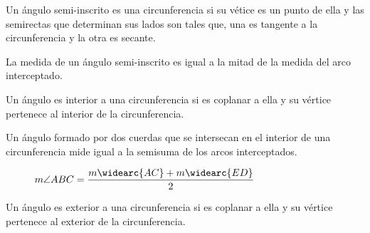 \begin{definition}
    Un ángulo semi-inscrito es una circunferencia si su vétice es un punto de ella y las semirectas que determinan sus lados son tales que, una es tangente a la circunferencia y la otra es secante.
\end{definition}

\begin{theorem}
    La medida de un ángulo semi-inscrito es igual a la mitad de la medida del arco interceptado.

    \begin{figure}[!h]
        \centering
        
        \label{fig:theorem32}
    \end{figure}
    
\end{theorem}

\clearpage

\begin{definition}
    Un ángulo es interior a una circunferencia si es coplanar a ella y su vértice pertenece al interior de la circunferencia.
\end{definition}

\begin{theorem}
    Un ángulo formado por dos cuerdas que se intersecan en el interior de una circunferencia mide igual a la semisuma de los arcos interceptados.

    \begin{figure}[!h]
        \centering
        
        \caption{$m\angle{ABC} = \dfrac{m\widearc{AC} + m\widearc{ED}}{2}$}
        \label{fig:theorem34}
    \end{figure}
    
\end{theorem}

\clearpage

\begin{definition}
    Un ángulo es exterior a una circunferencia si es coplanar a ella y su vértice pertenece al exterior de la circunferencia.
\end{definition}

